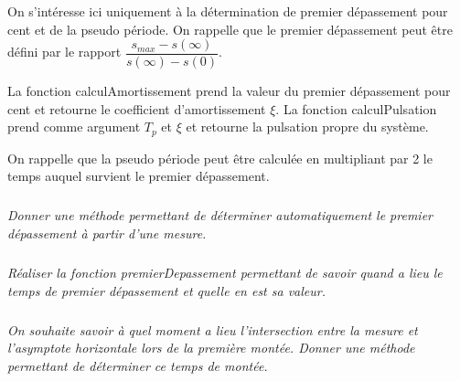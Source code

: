 \documentclass[10pt]{article}
\newif\ifprof
\begin{document}
On s'intéresse ici uniquement à la détermination de premier dépassement pour cent et de la pseudo période. On rappelle que le premier dépassement peut être défini par le rapport $\dfrac{s_{max}-s(\infty)}{s(\infty)-s(0)}$.

La fonction \textsf{calculAmortissement} prend la valeur du premier dépassement pour cent et retourne le coefficient d'amortissement $\xi$. La fonction \textsf{calculPulsation} prend comme argument $T_p$ et $\xi$ et retourne la pulsation propre du système. 

On rappelle que la pseudo période peut être calculée en multipliant par 2 le temps auquel survient le premier dépassement. 

\fi

\subparagraph{}
\textit{Donner une méthode permettant de déterminer automatiquement le premier dépassement à partir d'une mesure.}
\ifprof
\begin{corrige}
Il s'agit de rechercher le maximum $s_{max}$ de la liste. On réalise ensuite l'opération 
$d = \dfrac{s_{max}-s_{fin}}{s_{fin}-s_{0}}$.
\end{corrige}
\else
\fi



\subparagraph{}
\textit{Réaliser la fonction \textsf{premierDepassement} permettant de savoir quand a lieu le temps de premier dépassement et quelle en est sa valeur.}
\ifprof
\begin{corrige}
Selon l'idée précédente, il faut réaliser l'algorithme permettant de rechercher le maximum
de la liste des mesures. 

\begin{py}
\begin{python}
# Fonction à tester
def premierDepassement(temps,mesure):
    maxi = 0
    for i in range(len(mesure)):
        if mesure[i]>mesure[maxi]:
            i = maxi
    d = (mesure[maxi]-mesure[len(mesure)-1])/(mesure[len(mesure)-1]-mesure[0])
    res=[temps[i],dep]
    return res         
\end{python}
\end{py}

\end{corrige}
\else
\fi

\subparagraph{}
\textit{On souhaite savoir à quel moment a lieu l'intersection entre la mesure et l'asymptote horizontale lors de la première montée. Donner une méthode permettant de déterminer ce temps de montée.}
\ifprof
\begin{corrige}
On fait une recherche dichotomique comme dans la partie précédente.
\end{corrige}
\else
\fi
\end{document}

